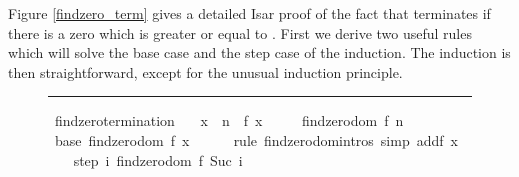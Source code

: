 \begin{isabellebody}
\begin{isamarkuptext}
  Figure \ref{findzero_term} gives a detailed Isar proof of the fact
  that  terminates if there is a zero which is greater
  or equal to . First we derive two useful rules which will
  solve the base case and the step case of the induction. The
  induction is then straightforward, except for the unusual induction
  principle.%
\end{isamarkuptext}%
\isamarkuptrue%
%
\begin{figure}
\hrule\vspace{6pt}
\begin{minipage}{0.8\textwidth}
\isastyle\isamarkuptrue
{}\isamarkupfalse%
\ findzero{}termination{}\isanewline
\ \ \ {}x\ {}\ n{}\ \ {}f\ x\ {}\ {}{}\isanewline
\ \ \ {}findzero{}dom\ {}f{}\ n{}{}\isanewline
%
\isadelimproof
%
\endisadelimproof
%
\isatagproof
{}\isamarkupfalse%
\ {}\ \isanewline
\ \ \isamarkupfalse%
\ base{}\ {}findzero{}dom\ {}f{}\ x{}{}\isanewline
\ \ \ \ \isamarkupfalse%
\ {}rule\ findzero{}domintros{}\ {}simp\ add{}{}f\ x\ {}\ {}{}{}\isanewline
\isanewline
\ \ \isamarkupfalse%
\ step{}\ {}{}i{}\ findzero{}dom\ {}f{}\ Suc\ i{}\ \isanewline

\end{minipage}
\end{figure}
\end{isabellebody}
